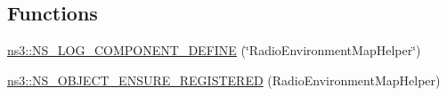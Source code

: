 \subsection*{Functions}
\begin{DoxyCompactItemize}
\item 
\hyperlink{namespacens3_a8ab6263d769b3674089bb30278163cdc}{ns3\+::\+N\+S\+\_\+\+L\+O\+G\+\_\+\+C\+O\+M\+P\+O\+N\+E\+N\+T\+\_\+\+D\+E\+F\+I\+NE} (\char`\"{}Radio\+Environment\+Map\+Helper\char`\"{})
\item 
\hyperlink{namespacens3_acb0a48a6a2c7cbc99da76330e1b1bf42}{ns3\+::\+N\+S\+\_\+\+O\+B\+J\+E\+C\+T\+\_\+\+E\+N\+S\+U\+R\+E\+\_\+\+R\+E\+G\+I\+S\+T\+E\+R\+ED} (Radio\+Environment\+Map\+Helper)
\end{DoxyCompactItemize}
